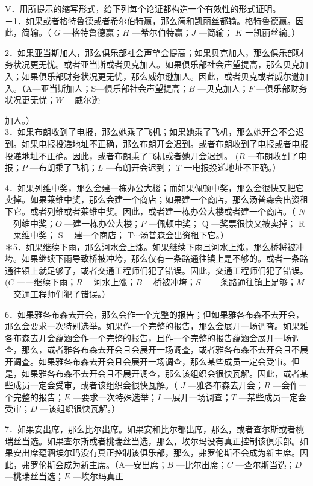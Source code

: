 V．用所提示的缩写形式，给下列每个论证都构造一个有效性的形式证明。\\
－1．如果或者格特鲁德或者希尔伯特赢，那么简和凯丽丝都输。格特鲁德赢。因此，简输。（ $G$ —格特鲁德赢；$H$ —希尔伯特赢；$J$ —简输； $K$ 一凯丽丝输。）

2．如果亚当斯加人，那么俱乐部社会声望会提高；如果贝克加人，那么俱乐部财务状况更无忧。或者亚当斯或者贝克加人。如果俱乐部社会声望提高，那么贝克加入；如果俱乐部财务状况更无忧，那么威尔逊加人。因此，或者贝克或者威尔逊加入。（A—亚当斯加人；S—俱乐部社会声望提高；$B$ —贝克加人；$F$ —俱乐部财务状况更无忧；$W$ —威尔逊

加人。）\\
3．如果布朗收到了电报，那么她乘了飞机；如果她乘了飞机，那么她开会不会迟到。如果电报投递地址不正确，那么布朗开会迟到。或者布朗收到了电报或者电报投递地址不正确。因此，或者布朗乘了飞机或者她开会迟到。 $(R$ 一布朗收到了电报；$P$ —布朗乘了飞机；$L$ —布朗开会迟到； $T$ 一电报投递地址不正确。）

4．如果列维中奖，那么会建一栋办公大楼；而如果佩顿中奖，那么会很快又把它卖掉。如果莱维中奖，那么会建一个商店；如果建一个商店，那么汤普森会出资租下它。或者列维或者莱维中奖。因此，或者建一栋办公大楼或者建一个商店。（ $N$－列维中奖；$O$ —建一栋办公大楼；$P$ —佩顿中奖； Q —奖票很快又被卖掉； R —莱维中奖； S —建一个商店； $\mathrm{T} \cdots$汤普森会出资租下它。）\\
＊5．如果继续下雨，那么河水会上涨。如果继续下雨且河水上涨，那么桥将被冲垮。如果继续下雨导致桥被冲垮，那么仅有一条路通往镇上是不够的。或者一条路通往镇上就足够了，或者交通工程师们犯了错误。因此，交通工程师们犯了错误。 $(C$ 一一继续下雨；$R$ —河水上涨；$B$ —桥被冲垮；$S$ ——条路通往镇上足够；$M$ —交通工程师们犯了错误。）

6．如果雅各布森去开会，那么会作一个完整的报告；但如果雅各布森不去开会，那么会要求一次特别选举。如果作一个完整的报告，那么会展开一场调査。如果雅各布森去开会蕴涵会作一个完整的报告，且作一个完整的报告蕴涵会展开一场调查，那么，或者雅各布森去开会且会展开一场调査，或者雅各布森不去开会且不展开调査。如果雅各布森去开会且会展开一场调查，那么某些成员一定会受审。但是，如果雅各布森不去开会且不展开调查，那么该组织会很快瓦解。因此，或者某些成员一定会受审，或者该组织会很快瓦解。（ $J$ —雅各布森去开会；$R$ —会作一个完整的报告；$E$ —要求一次特殊选举；$I$ —展开一场调查；$T$ —某些成员一定会受审；$D$ —该组织很快瓦解。）

7．如果安出席，那么比尔出席。如果安和比尔都出席，那么，或者查尔斯或者桃瑞丝当选。如果查尔斯或者桃瑞丝当选，那么，埃尔玛没有真正控制该俱乐部。如果安出席蕴涵埃尔玛没有真正控制该俱乐部，那么，弗罗伦斯不会成为新主席。因此，弗罗伦斯会成为新主席。（A—安出席；$B$ —比尔出席；$C$ —查尔斯当选；$D$ —桃瑞丝当选；$E$ —埃尔玛真正


